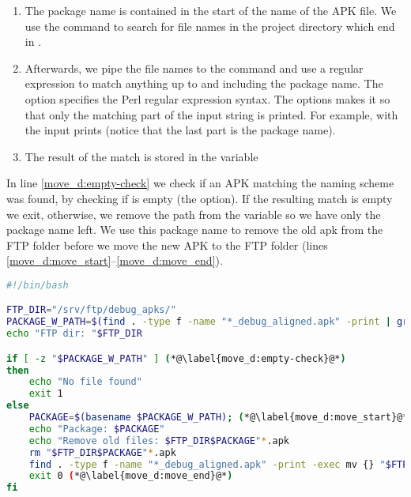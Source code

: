 \begin{enumerate}
  \item The package name is contained in the start of the name of the APK file. We use the  command to search for file names in the project directory which end in .
  \item Afterwards, we pipe the file names to the  command and use a regular expression to match anything up to and including the package name. The  option specifies the Perl regular expression syntax. The  options makes it so that only the matching part of the input string is printed. For example,  with the input  prints  (notice that the last part is the package name).
  \item The result of the match is stored in the variable 
\end{enumerate}

In line \ref{move_d:empty-check} we check if an APK matching the naming scheme was found, by checking if  is empty (the  option). If the resulting match is empty we exit, otherwise, we remove the path from the variable  so we have only the package name left. We use this package name to remove the old apk from the FTP folder before we move the new APK to the FTP folder (lines \ref{move_d:move_start}--\ref{move_d:move_end}).

\begin{lstlisting}[language=bash,showstringspaces=false,caption=Script that moves the debug APK to the ftp server,label=lst:move_debug_apk]
#!/bin/bash

FTP_DIR="/srv/ftp/debug_apks/"
PACKAGE_W_PATH=$(find . -type f -name "*_debug_aligned.apk" -print | grep ".+(?=_v.+b[0-9]+_debug_aligned\.apk)" -Po) (*@\label{move_d:package}@*)
echo "FTP dir: "$FTP_DIR

if [ -z "$PACKAGE_W_PATH" ] (*@\label{move_d:empty-check}@*)
then
    echo "No file found"
    exit 1
else
    PACKAGE=$(basename $PACKAGE_W_PATH); (*@\label{move_d:move_start}@*)
    echo "Package: $PACKAGE"
    echo "Remove old files: $FTP_DIR$PACKAGE"*.apk
    rm "$FTP_DIR$PACKAGE"*.apk
    find . -type f -name "*_debug_aligned.apk" -print -exec mv {} "$FTP_DIR" \;
    exit 0 (*@\label{move_d:move_end}@*)
fi
\end{lstlisting}

